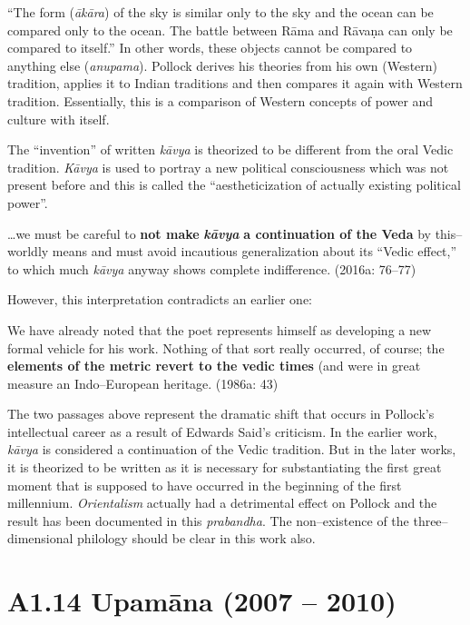 “The form (\textit{ākāra}) of the sky is similar only to the sky and the ocean can be compared only to the ocean. The battle between Rāma and Rāvaṇa can only be compared to itself.” In other words, these objects cannot be compared to anything else (\textit{anupama}). Pollock derives his theories from his own (Western) tradition, applies it to Indian traditions and then compares it again with Western tradition. Essentially, this is a comparison of Western concepts of power and culture with itself.

The “invention” of written \textit{kāvya} is theorized to be different from the oral Vedic tradition. \textit{Kāvya }is used to portray a new political consciousness which was not present before and this is called the “aestheticization of actually existing political power”.

\begin{myquote}
…we must be careful to \textbf{not make }\textit{\textbf{kāvya }}\textbf{a continuation of the Veda} by this–worldly means and must avoid incautious generalization about its “Vedic effect,” to which much\textit{ kāvya }anyway shows complete indifference. (2016a: 76–77)
\end{myquote}

However, this interpretation contradicts an earlier one:

\begin{myquote}
We have already noted that the poet represents himself as developing a new formal vehicle for his work. Nothing of that sort really occurred, of course; the \textbf{elements of the metric revert to the vedic times} (and were in great measure an Indo–European heritage. (1986a: 43)
\end{myquote}

The two passages above represent the dramatic shift that occurs in Pollock’s intellectual career as a result of Edwards Said’s criticism. In the earlier work, \textit{kāvya }is considered a continuation of the Vedic tradition. But in the later works, it is theorized to be written as it is necessary for substantiating the first great moment that is supposed to have occurred in the beginning of the first millennium. \textit{Orientalism} actually had a detrimental effect on Pollock and the result has been documented in this \textit{prabandha}. The non–existence of the three–dimensional philology should be clear in this work also.


\section*{A1.14 Upamāna (2007 – 2010)}

